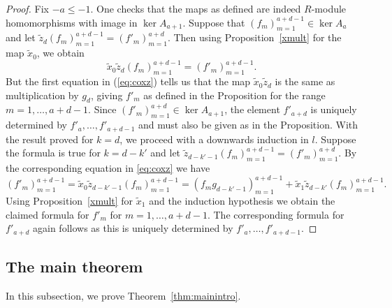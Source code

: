 \documentclass[a4paper,11pt]{amsart}
\theoremstyle{plain}
\theoremstyle{definition}
\begin{document}
\begin{proof}
    Fix $-a \leqslant -1$. One checks that the maps as defined are indeed $R$-module homomorphisms with image in $\ker A_{a+1}$. Suppose that $(f_m)_{m=1}^{a+d-1} \in \ker A_a$ and let $\tilde z_d (f_m)_{m=1}^{a+d-1} = (f'_m)_{m=1}^{a+d}$. Then using Proposition~\ref{xmult} for the map $\tilde x_0$, we obtain
    \begin{equation*}
        \tilde{x}_0 \tilde{z}_d (f_m)_{m=1}^{a+d-1} = (f'_m)_{m=1}^{a+d-1}.
    \end{equation*}
    But the first equation in (\ref{eq:coxz}) tells us that the map $\tilde x_0 \tilde z_d$ is the same as multiplication by $g_d$, giving $f'_m$ as defined in the Proposition for the range $m = 1, \dots, a+d-1$. Since $(f'_m)_{m=1}^{a+d} \in \ker A_{a+1}$, the element $f'_{a+d}$ is uniquely determined by $f'_{a},\dots,f'_{a+d-1}$ and must also be given as in the Proposition. With the result proved for $k=d$, we proceed with a downwards induction in $l$. Suppose the formula is true for $k = d-k'$ and let $\tilde z_{d-k'-1} (f_m)_{m=1}^{a+d-1} = (f'_m)_{m=1}^{a+d}$. By the corresponding equation in \eqref{eq:coxz} we have
    \begin{equation*}
        (f'_m)_{m=1}^{a+d-1} = \tilde{x}_0 \tilde{z}_{d-k'-1} (f_m)_{m=1}^{a+d-1} = (f_m g_{d-k'-1})_{m=1}^{a+d-1} +\tilde{x}_1 \tilde{z}_{d-k'}(f_m)_{m=1}^{a+d-1}.
    \end{equation*}
    Using Proposition~\ref{xmult} for $\tilde x_1$ and the induction hypothesis we obtain the claimed formula for $f'_m$ for $m = 1,\dots,a+d-1$. The corresponding formula for $f'_{a+d}$ again follows as this is uniquely determined by $f'_{a},\dots,f'_{a+d-1}$.
\end{proof}

\subsection{The main theorem}

In this subsection, we prove Theorem~\ref{thm:mainintro}. 

\end{document}
